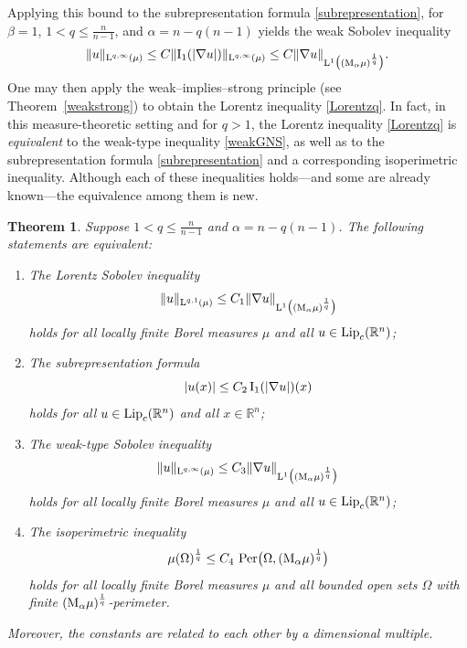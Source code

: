\documentclass[11pt, a4paper, reqno]{amsart}
\newcommand{\R}{\mathbb R}
\newcommand{\al}{\alpha}
\newcommand{\Lup}{\textup{L}}
\DeclareMathOperator{\Lip}{\textup{Lip}}
\DeclareMathOperator{\Per}{\textup{Per}}
\newtheorem{theorem}{Theorem}[section]
\theoremstyle{definition}
\theoremstyle{remark}
\begin{document}
Applying this bound to the subrepresentation formula \eqref{subrepresentation}, for $\beta=1$, $1<q\leq \frac{n}{n-1}$, and $\al=n-q(n-1)$
yields the weak Sobolev inequality
\begin{equation}\label{weakGNS}
\|u\|_{\Lup^{q,\infty}(\mu)}
\le C \|\textup{I}_1(|\nabla u|)\|_{\Lup^{q,\infty}(\mu)}
\le C \|\nabla u\|_{\Lup^1\bigl((\textup{M}_\al\mu)^{\frac1q}\bigr)}.
\end{equation}
One may then apply the weak–implies–strong principle (see Theorem~\ref{weakstrong}) to obtain the Lorentz inequality \eqref{Lorentzq}. In fact, in this measure-theoretic setting and for $q>1$, the Lorentz inequality \eqref{Lorentzq} is \emph{equivalent} to the weak-type inequality \eqref{weakGNS}, as well as to the subrepresentation formula \eqref{subrepresentation} and a corresponding isoperimetric inequality. Although each of these inequalities holds—and some are already known—the equivalence among them is new.

\begin{theorem}\label{characterizethm}
Suppose $1<q\leq \frac{n}{n-1}$ and $\al=n-q(n-1)$.  The following statements are equivalent:
\begin{enumerate}
\item The Lorentz Sobolev inequality
\[
\|u\|_{\Lup^{q,1}(\mu)}
\le C_1 \|\nabla u\|_{\Lup^1\bigl((\textup{M}_\al\mu)^{\frac1q}\bigr)}
\]
holds for all locally finite Borel measures $\mu$ and all
$u\in \Lip_c(\R^n)$;


\item The subrepresentation formula
\[
|u(x)| \le C_2\, \textup{I}_1(|\nabla u|)(x)
\]
holds for all $u\in \Lip_c(\R^n)$ and all $x\in \R^n$;

\item The weak-type Sobolev inequality
\[
\|u\|_{\Lup^{q,\infty}(\mu)}
\le C_3 \|\nabla u\|_{\Lup^1\bigl((\textup{M}_\al\mu)^{\frac1q}\bigr)}
\]
holds for all locally finite Borel measures $\mu$ and all
$u\in \Lip_c(\R^n)$;

\item The isoperimetric inequality
\begin{equation}\label{qisoper}
\mu(\Omega)^{\frac{1}{q}}
\le C_4\, \Per\!\big(\Omega,(\textup{M}_\al\mu)^{\frac1q}\big)
\end{equation}
holds for all locally finite Borel measures $\mu$ and all bounded open sets
$\Omega$ with finite $(\textup{M}_\al\mu)^{\frac1q}$-perimeter.
\end{enumerate}
Moreover, the constants are related to each other by a dimensional multiple.
\end{theorem}
\end{document}
